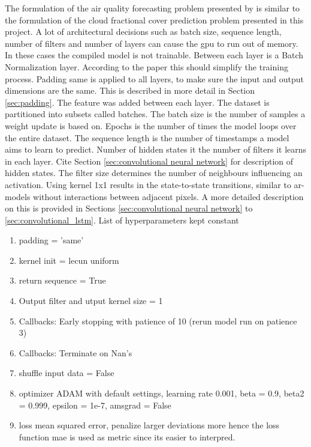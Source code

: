 The formulation of the air quality forecasting problem presented by  \citeauthor{SunAirLSTM} is similar to the formulation of the cloud fractional cover prediction problem presented in this project. %
A lot of architectural decisions such as batch size, sequence length, number of filters and number of layers can cause the \acrshort{gpu} to run out of memory. In these cases the compiled model is not trainable. Between each layer is a Batch Normalization layer. According to the paper  this should simplify the training process. Padding same is applied to all layers, to make sure the input and output dimensions are the same. This is described in more detail in Section \ref{sec:padding}. The feature was added between each layer. The dataset is partitioned into subsets called batches. The batch size is the number of samples a weight update is based on. Epochs is the number of times the model loops over the entire dataset. The sequence length is the number of timestamps a model aims to learn to predict. Number of hidden states it the number of filters it learns in each layer. Cite Section \ref{sec:convolutional neural network} for description of hidden states. 
The filter size determines the number of neighbours influencing an activation. Using kernel 1x1 results in the state-to-state transitions, similar to \acrshort{ar}-models without interactions between adjacent pixels. A more detailed description on this is provided in Sections \ref{sec:convolutional neural network} to \ref{sec:convolutional_lstm}. 
\newline \newline
List of hyperparameters kept constant
\begin{enumerate}
    \item padding = 'same'
    \item kernel init = lecun uniform
    \item return sequence = True %
    \item Output filter and utput kernel size = 1
    \item Callbacks:  Early stopping with patience of 10 (rerun model run on patience 3)
    \item Callbacks: Terminate on Nan's 
    \item shuffle input data = False
    \item optimizer ADAM with default settings, 
    learning rate 0.001, beta = 0.9, beta2 = 0.999, epsilon = 1e-7, amsgrad = False 
    \item loss mean squared error, penalize larger deviations more hence the loss function mae is used as metric since its easier to interpred. 
\end{enumerate}

